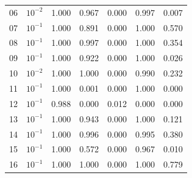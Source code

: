 \begin{tabular}{rcrrrrr}
06 & $10^{-2}$ & 1.000 & 0.967 & 0.000 & 0.997 & 0.007 \\
07 & $10^{-1}$ & 1.000 & 0.891 & 0.000 & 1.000 & 0.570 \\
08 & $10^{-1}$ & 1.000 & 0.997 & 0.000 & 1.000 & 0.354 \\
09 & $10^{-1}$ & 1.000 & 0.922 & 0.000 & 1.000 & 0.026 \\
10 & $10^{-2}$ & 1.000 & 1.000 & 0.000 & 0.990 & 0.232 \\
11 & $10^{-1}$ & 1.000 & 0.001 & 0.000 & 1.000 & 0.000 \\
12 & $10^{-1}$ & 0.988 & 0.000 & 0.012 & 0.000 & 0.000 \\
13 & $10^{-1}$ & 1.000 & 0.943 & 0.000 & 1.000 & 0.121 \\
14 & $10^{-1}$ & 1.000 & 0.996 & 0.000 & 0.995 & 0.380 \\
15 & $10^{-1}$ & 1.000 & 0.572 & 0.000 & 0.967 & 0.010 \\
16 & $10^{-1}$ & 1.000 & 1.000 & 0.000 & 1.000 & 0.779 \\
\bottomrule
\end{tabular}
